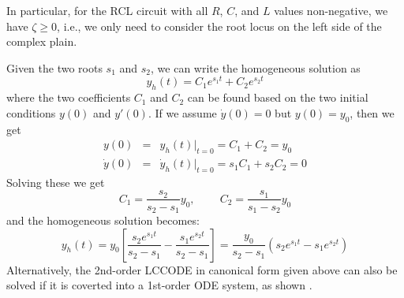 In particular, for the RCL circuit with all $R$, $C$, and $L$ values 
non-negative, we have $\zeta\ge 0$, i.e., we only need to consider the 
root locus on the left side of the complex plain.

Given the two roots $s_1$ and $s_2$, we can write the homogeneous 
solution as
\[
y_h(t)=C_1 e^{s_1t}+C_2 e^{s_2t} 
\]
where the two coefficients $C_1$ and $C_2$ can be found based on the 
two initial conditions $y(0)$ and $y'(0)$. If we assume $\dot{y}(0)=0$ 
but $y(0)=y_0$, then we get
\begin{eqnarray}
  y(0)&=&y_h(t)\bigg|_{t=0}=C_1+C_2=y_0  \nonumber \\
  \dot{y}(0)&=&\dot{y}_h(t)\bigg|_{t=0}=s_1C_1+s_2C_2=0 \nonumber
\end{eqnarray}
Solving these we get
\[
C_1=\frac{s_2}{s_2-s_1} y_0,\;\;\;\;\;\;\;\;C_2=\frac{s_1}{s_1-s_2} y_0 
\]
and the homogeneous solution becomes:
\[
y_h(t)=y_0 \left[ \frac{s_2 e^{s_1t}}{s_2-s_1}-\frac{s_1 e^{s_2t}}{s_2-s_1} \right]
=\frac{y_0}{s_2-s_1} (s_2 e^{s_1t}-s_1 e^{s_2t})
\]
Alternatively, the 2nd-order LCCODE in canonical form given above can 
also be solved if it is coverted into a 1st-order ODE system, as
shown .



